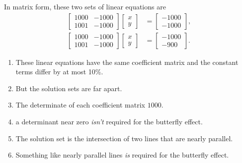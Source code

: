 \documentclass[usenames,dvipsnames,fleqn]{beamer}
\theoremstyle{definition}
\begin{document}
\begin{frame}
In matrix form, these two sets of linear equations are
\begin{align*}
 \begin{bmatrix} 1000& -1000 \\ 1001 & -1000 \end{bmatrix} \begin{bmatrix} x \\ y \end{bmatrix} &= 
     \begin{bmatrix} -1000 \\ -1000 \end{bmatrix}, \\
 \begin{bmatrix} 1000 & -1000 \\ 1001 & -1000 \end{bmatrix} \begin{bmatrix} x \\ y \end{bmatrix} &= 
     \begin{bmatrix} -1000 \\ -900 \end{bmatrix}.   
\end{align*}

\begin{enumerate}

\item These linear equations have the same coefficient matrix and the constant terms differ by at most 10\%.

\item But the solution sets are far apart. 

\item The determinate of each coefficient matrix \(1000\).

\item a  determinant near zero \emph{isn't} required for the butterfly effect.

\item The solution set is the intersection of two lines that are nearly parallel.

\item Something like nearly parallel lines \emph{is}  required for the butterfly effect.

\end{enumerate}
\end{frame}
\end{document}

